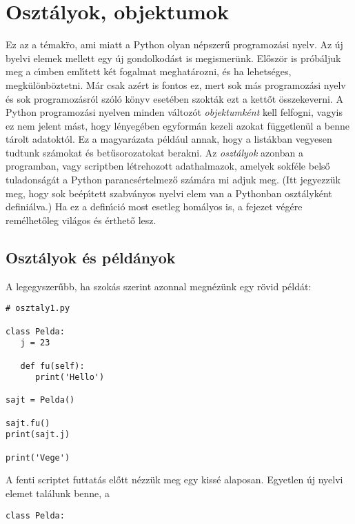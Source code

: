 \section{Oszt\'alyok, objektumok}

Ez az a t\'emak\"ro, ami miatt a Python olyan n\'epszer\H{u} programoz\'asi nyelv. Az \'uj byelvi elemek mellett egy 
\'uj gondolkod\'ast is megismer\"unk. El\H{o}sz\"or is pr\'ob\'aljuk meg a c\'{\i}mben eml\'{\i}tett k\'et fogalmat 
meghat\'arozni, \'es ha lehets\'eges, megk\"ul\"onb\"oztetni. M\'ar csak az\'ert is fontos ez, mert sok m\'as 
programoz\'asi nyelv \'es sok programoz\'asr\'ol sz\'ol\'o k\"onyv eset\'eben szokt\'ak ezt a kett\H{o}t 
\"osszekeverni. A Python programoz\'asi nyelven minden v\'altoz\'ot {\sl objektumk\'ent}  kell 
felfogni, vagyis ez nem jelent m\'ast, hogy l\'enyeg\'eben egyform\'an kezeli azokat f\"uggetlen\"ul a benne 
t\'arolt adatokt\'ol. Ez a magyar\'azata p\'eld\'aul annak, hogy a list\'akban vegyesen tudtunk sz\'amokat \'es 
bet\H{u}sorozatokat berakni. Az {\sl oszt\'alyok}  azonban a programban, vagy scriptben 
l\'etrehozott adathalmazok, amelyek sokf\'ele bels\H{o} tuladons\'ag\'at a Python parancs\'ertelmez\H{o} 
sz\'am\'ara mi adjuk meg. (Itt jegyezz\"uk meg, hogy sok be\'ep\'{\i}tett szabv\'anyos nyelvi elem van a Pythonban 
oszt\'alyk\'ent defini\'alva.) Ha ez a defin\'{\i}ci\'o most esetleg hom\'alyos is, a fejezet v\'eg\'ere rem\'elhet\H{o}leg 
vil\'agos \'es \'erthet\H{o} lesz.

\subsection{Oszt\'alyok \'es p\'eld\'anyok}

A legegyszer\H{u}bb, ha szok\'as szerint azonnal megn\'ez\"unk egy r\"ovid p\'eld\'at:

\begin{Verbatim}[fontsize=\small]
# osztaly1.py

class Pelda:
   j = 23

   def fu(self):
      print('Hello')

sajt = Pelda()

sajt.fu()
print(sajt.j)

print('Vege')
\end{Verbatim}

A fenti scriptet futtat\'as el\H{o}tt n\'ezz\"uk meg egy kiss\'e alaposan. Egyetlen \'uj nyelvi elemet tal\'alunk 
benne, a 

\begin{Verbatim}[fontsize=\small]
class Pelda:
\end{Verbatim}

